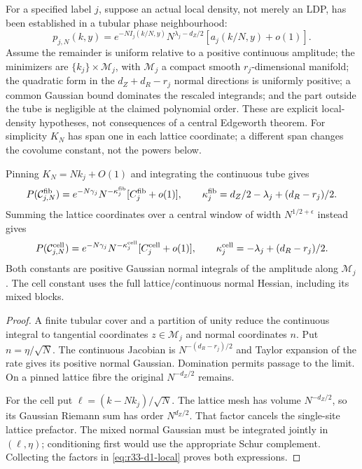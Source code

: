 For a specified label $j$, suppose an actual local density, not merely an
LDP, has been established in a tubular phase neighbourhood:
\begin{equation}\label{eq:r33-d1-local}
 p_{j,N}(k,y)=e^{-NI_j(k/N,y)}N^{\lambda_j-d_Z/2}
                 [a_j(k/N,y)+o(1)].
\end{equation}
Assume the remainder is uniform relative to a positive continuous amplitude;
the minimizers are $\{k_j\}\times\mathcal M_j$, with
$\mathcal M_j$ a compact smooth $r_j$-dimensional manifold; the quadratic form
in the $d_Z+d_R-r_j$ normal directions is uniformly positive; a common
Gaussian bound dominates the rescaled integrands; and the part outside the
tube is negligible at the claimed polynomial order.  These are explicit
local-density hypotheses, not consequences of a central Edgeworth theorem.
For simplicity $K_N$ has span one in each lattice coordinate; a different
span changes the covolume constant, not the powers below.

\begin{theorem}
\label{thm:r33-d1-laplace}
Pinning $K_N=Nk_j+O(1)$ and integrating the continuous tube gives
\[
 P(\mathcal C_{j,N}^{\rm fib})
 =e^{-N\gamma_j}N^{-\kappa_j^{\rm fib}}[C_j^{\rm fib}+o(1)],
 \qquad
 \kappa_j^{\rm fib}=d_Z/2-\lambda_j+(d_R-r_j)/2.
\]
Summing the lattice coordinates over a central window of width
$N^{1/2+\epsilon}$ instead gives
\[
 P(\mathcal C_{j,N}^{\rm cell})
 =e^{-N\gamma_j}N^{-\kappa_j^{\rm cell}}[C_j^{\rm cell}+o(1)],
 \qquad
 \kappa_j^{\rm cell}=-\lambda_j+(d_R-r_j)/2.
\]
Both constants are positive Gaussian normal integrals of the amplitude along
$\mathcal M_j$.  The cell constant uses the full lattice/continuous normal
Hessian, including its mixed blocks.
\end{theorem}
\begin{proof}
A finite tubular cover and a partition of unity reduce the continuous
integral to tangential coordinates $z\in\mathcal M_j$ and normal coordinates
$n$.  Put $n=\eta/\sqrt N$.  The continuous Jacobian is
$N^{-(d_R-r_j)/2}$ and Taylor expansion of the rate gives its positive
normal Gaussian.  Domination permits passage to the limit.  On a pinned
lattice fibre the original $N^{-d_Z/2}$ remains.

For the cell put $\ell=(k-Nk_j)/\sqrt N$.  The lattice mesh has volume
$N^{-d_Z/2}$, so its Gaussian Riemann sum has order $N^{d_Z/2}$.
That factor cancels the single-site lattice prefactor.  The mixed normal
Gaussian must be integrated jointly in $(\ell,\eta)$; conditioning first
would use the appropriate Schur complement.  Collecting the factors in
\eqref{eq:r33-d1-local} proves both expressions.
\end{proof}

